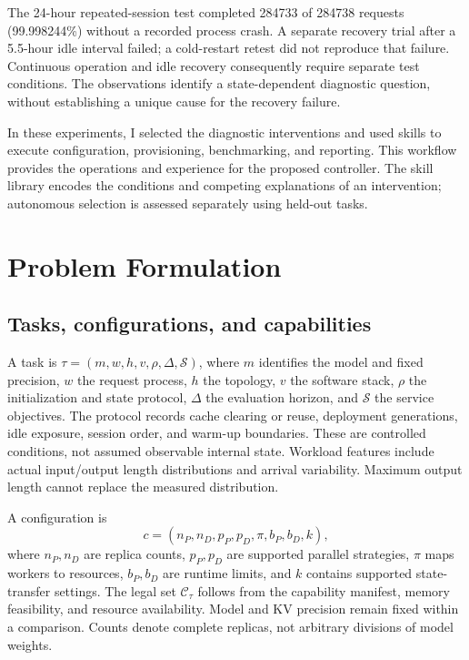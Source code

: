 \documentclass[preprint,12pt]{elsarticle}
\begin{document}
The 24-hour repeated-session test completed 284733 of 284738 requests (99.998244\%) without a recorded process crash. A separate recovery trial after a 5.5-hour idle interval failed; a cold-restart retest did not reproduce that failure. Continuous operation and idle recovery consequently require separate test conditions. The observations identify a state-dependent diagnostic question, without establishing a unique cause for the recovery failure.

In these experiments, I selected the diagnostic interventions and used skills to execute configuration, provisioning, benchmarking, and reporting. This workflow provides the operations and experience for the proposed controller. The skill library encodes the conditions and competing explanations of an intervention; autonomous selection is assessed separately using held-out tasks.

\section{Problem Formulation}
\subsection{Tasks, configurations, and capabilities}
A task is $\tau=(m,w,h,v,\rho,\Delta,\mathcal{S})$, where $m$ identifies the model and fixed precision, $w$ the request process, $h$ the topology, $v$ the software stack, $\rho$ the initialization and state protocol, $\Delta$ the evaluation horizon, and $\mathcal{S}$ the service objectives. The protocol records cache clearing or reuse, deployment generations, idle exposure, session order, and warm-up boundaries. These are controlled conditions, not assumed observable internal state. Workload features include actual input/output length distributions and arrival variability. Maximum output length cannot replace the measured distribution.

A configuration is
\begin{equation}
 c=(n_P,n_D,p_P,p_D,\pi,b_P,b_D,k),
\end{equation}
where $n_P,n_D$ are replica counts, $p_P,p_D$ are supported parallel strategies, $\pi$ maps workers to resources, $b_P,b_D$ are runtime limits, and $k$ contains supported state-transfer settings. The legal set $\mathcal{C}_{\tau}$ follows from the capability manifest, memory feasibility, and resource availability. Model and KV precision remain fixed within a comparison. Counts denote complete replicas, not arbitrary divisions of model weights.
\end{document}
